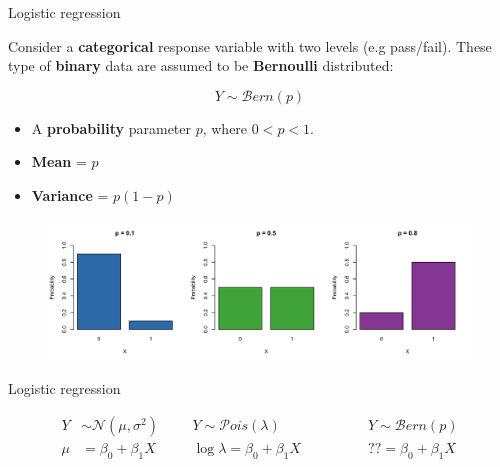 \documentclass[pdf]{beamer}
\begin{document}
\begin{frame}{Logistic regression}

Consider a \textbf{categorical} response variable with two levels (e.g pass/fail). 
These type of \textbf{binary} data are assumed to be \textbf{Bernoulli} distributed:

$$
Y \sim \mathcal{B}ern(p)
$$

\begin{itemize}\addtolength{\itemsep}{.25\baselineskip}
    \item A \textbf{probability} parameter $p$, where $0 < p < 1$.
    \item \textbf{Mean} = $p$  
    \item \textbf{Variance} = $p(1 - p)$
\end{itemize}

\begin{figure}
\includegraphics[width=.9\textwidth]{berndist.png}
\end{figure}

\end{frame}

\begin{frame}{Logistic regression}

$$
\begin{aligned}
Y & \sim \mathcal{N}(\mu, \sigma^2) &&& Y  \sim \mathcal{P}ois(\lambda) &&&&&& Y  \sim \mathcal{B}ern(p)\\
\mu & = \beta_0 + \beta_1X &&& \log{\lambda} = \beta_0 + \beta_1X &&&&&& ?? = \beta_0 + \beta_1X
\end{aligned}
$$

\vfill


\end{frame}
\end{document}
